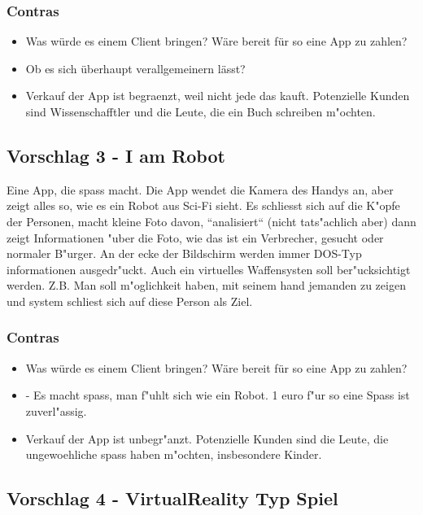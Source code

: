 \vspace{0.2cm}

\subsubsection{Contras}
\begin{itemize}
\item Was würde es einem Client bringen? Wäre bereit für so eine App zu zahlen?
\item Ob es sich überhaupt verallgemeinern lässt?
\item Verkauf der App ist begraenzt, weil nicht jede das kauft. Potenzielle Kunden sind Wissenschafftler und die Leute, die ein Buch schreiben m"ochten.
\end{itemize}

\subsection{Vorschlag 3 - I am Robot}

Eine App, die spass macht. Die App wendet die Kamera des Handys an, aber zeigt alles so, wie es ein Robot aus Sci-Fi sieht. Es schliesst sich auf die K"opfe der Personen, macht kleine Foto davon, ``analisiert`` (nicht tats"achlich aber) dann zeigt Informationen "uber die Foto, wie das ist ein Verbrecher, gesucht oder normaler B"urger. An der ecke der Bildschirm werden immer DOS-Typ informationen ausgedr"uckt.
Auch ein virtuelles Waffensysten soll ber"ucksichtigt werden. Z.B. Man soll m"oglichkeit haben, mit seinem hand jemanden zu zeigen und system schliest sich auf diese Person als Ziel.

\subsubsection{Contras}
\begin{itemize}
\item Was würde es einem Client bringen? Wäre bereit für so eine App zu zahlen?
\item - Es macht spass, man f"uhlt sich wie ein Robot. 1 euro f"ur so eine Spass ist zuverl"assig.
\item Verkauf der App ist unbegr"anzt. Potenzielle Kunden sind die Leute, die ungewoehliche spass haben m"ochten, insbesondere Kinder.
\end{itemize}

\subsection{Vorschlag 4 - VirtualReality Typ Spiel}

